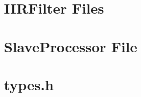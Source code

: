 \documentclass[11pt]{report}
\begin{document}
\chapter{IIRFilter Files}



\chapter{SlaveProcessor File}



\chapter{types.h}

\end{document}

